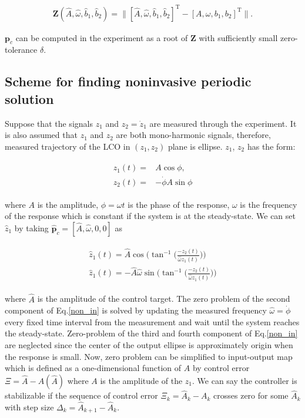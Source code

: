 \documentclass[openacc]{rsproca_new}%
\theoremstyle{own}
\def\vec#1{\ensuremath{\mathbf{#1}}}
\begin{document}
\begin{align}\label{non_in}
\vec Z(\hat A,\hat \omega,\hat b_1,\hat b_2)=\|[\hat A,\hat \omega,\hat b_1,\hat b_2]^\textrm{T}-[A,\omega,b_1,b_2]^\textrm{T}\|.
\end{align}

\noindent $\vec p_c$ can be computed in the experiment as a root of $\vec Z$ with sufficiently small zero-tolerance $\delta$.

\subsection{Scheme for finding noninvasive periodic solution}\label{FNP}

Suppose that the signals $z_1$ and $z_2=\dot z_1$ are measured through the experiment. It is also assumed that $z_1$ and $z_2$ are both mono-harmonic signals, therefore, measured trajectory of the LCO in $(z_1,z_2)$ plane is ellipse. $z_1$, $z_2$ has the form:

\begin{align}\label{eq:25}
\begin{split}
z_{1}(t)=&A\cos{\phi},\\
z_{2}(t)=&-\dot\phi A\sin{\phi}
\end{split}
\end{align}

\noindent where $A$ is the amplitude, $\phi=\omega t$ is the phase of the response, $\omega$ is the frequency of the response which is constant if the system is at the steady-state. We can set $\hat z_1$ by taking $\hat {\vec p}_c=[\hat A,\hat \omega,0,0]$ as

\begin{align}\label{eq:26}
  \begin{split}
\hat z_1(t)=\hat A\cos\Big(\tan^{-1}\Big({\frac{-z_{2}(t)}{ \hat \omega z_{1}(t)}}\Big) \Big)\\
\hat z_1(t)=-\hat A \hat \omega \sin\Big(\tan^{-1}\Big({\frac{-z_{2}(t)}{ \hat \omega z_{1}(t)}}\Big) \Big)
\end{split}
\end{align}

\noindent where $\hat A$ is the amplitude of the control target. The zero problem of the second component of Eq.\ref{non_in} is solved by updating the measured frequency $\hat \omega=\dot\phi$ every fixed time interval from the measurement and wait until the system reaches the steady-state. Zero-problem of the third and fourth component of Eq.\ref{non_in} are neglected since the center of the output ellipse is approximately origin when the response is small. Now, zero problem can be simplified to input-output map which is defined as a one-dimensional function of $\hat A$ by control error $\Xi=\hat A -  A(\hat A)$ where $A$ is the amplitude of the $z_1$. We can say the controller is stabilizable if the sequence of control error $\Xi_k=\hat A_k-A_k$ crosses zero for some $\hat A_k$ with step size $\Delta_k=\hat A_{k+1}-\hat A_{k}$.
\end{document}
